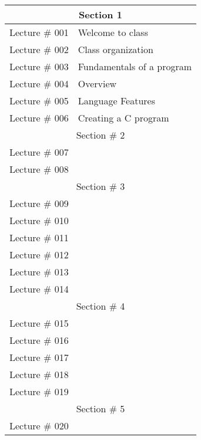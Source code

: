 \begin{center}
   \begin{longtable}{ | p{5cm} | p{8cm} | }
        \hline
        \multicolumn{2}{|c|}{Section 1} \\
        \hline
        Lecture \# 001 & Welcome to class \\
        Lecture \# 002 & Class organization \\
        Lecture \# 003 & Fundamentals of a program \\
        Lecture \# 004 & Overview \\
        Lecture \# 005 & Language Features \\
        Lecture \# 006 & Creating a C program \\
        \hline
        \multicolumn{2}{|c|}{Section \# 2} \\ 
        \hline
        Lecture \# 007 &  \\
        Lecture \# 008 &  \\
        \hline
        \multicolumn{2}{|c|}{Section \# 3} \\ 
        \hline
        Lecture \# 009 &  \\
        Lecture \# 010 &  \\
        Lecture \# 011 &  \\
        Lecture \# 012 &  \\
        Lecture \# 013 &  \\
        Lecture \# 014 &  \\
        \hline
        \multicolumn{2}{|c|}{Section \# 4} \\ 
        \hline
        Lecture \# 015 &  \\
        Lecture \# 016 &  \\
        Lecture \# 017 &  \\
        Lecture \# 018 &  \\
        Lecture \# 019 &  \\
        \hline
        \multicolumn{2}{|c|}{Section \# 5} \\ 
        \hline
        Lecture \# 020 &  \\

\end{longtable}
\end{center}
